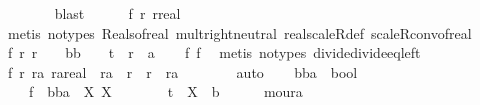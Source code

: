\begin{isabellebody}
\ \ \ \ \ \ \isamarkupfalse%
\ blast\isanewline
\ \ \ \ \isamarkupfalse%
\ f{}{\isacharcolon}\ {\isachardoublequoteopen}{\isasymforall}r{\isachardot}\ {\isacharparenleft}r{\isacharcolon}{\isacharcolon}real{\isacharparenright}\ {\isasymin}\ {\isasymreal}{\isachardoublequoteclose}\isanewline
\ \ \ \ \ \ \isamarkupfalse%
\ {\isacharparenleft}metis\ {\isacharparenleft}no{\isacharunderscore}types{\isacharparenright}\ Reals{\isacharunderscore}of{\isacharunderscore}real\ mult{\isachardot}right{\isacharunderscore}neutral\ real{\isacharunderscore}scaleR{\isacharunderscore}def\ scaleR{\isacharunderscore}conv{\isacharunderscore}of{\isacharunderscore}real{\isacharparenright}\isanewline
{}\isamarkupfalse%
\ \isamarkupfalse%
\ f{}{\isacharcolon}\ {\isachardoublequoteopen}{\isasymforall}r{\isachardot}\ {\isacharparenleft}r\ {\isacharequal}\ {}\ {\isasymor}\ bb{\isacharparenright}\ {\isasymor}\ {}\ {\isacharslash}\ t\ {\isacharslash}\ r\ {\isasymnoteq}\ a{\isachardoublequoteclose}\isanewline
\ \ \isamarkupfalse%
\ f{}\ f{}\ \isamarkupfalse%
\ {\isacharparenleft}metis\ {\isacharparenleft}no{\isacharunderscore}types{\isacharparenright}\ divide{\isacharunderscore}divide{\isacharunderscore}eq{\isacharunderscore}left{\isacharparenright}\isanewline
\ \ \isamarkupfalse%
\ f{}{\isacharcolon}\ {\isachardoublequoteopen}{\isasymforall}r\ ra{\isachardot}\ {\isacharparenleft}ra{\isacharcolon}{\isacharcolon}real{\isacharparenright}\ {\isacharslash}\ {\isacharparenleft}ra\ {\isacharslash}\ r{\isacharparenright}\ {\isacharequal}\ r\ {\isasymor}\ ra\ {\isacharequal}\ {}{\isachardoublequoteclose}\isanewline
\ \ \ \ \isamarkupfalse%
\ auto\isanewline
\ \ \isamarkupfalse%
\ bba\ {\isacharcolon}{\isacharcolon}\ bool\ \isanewline
\ \ \ \ f{}{\isacharcolon}\ {\isachardoublequoteopen}{\isacharparenleft}{\isasymnot}\ bba{\isacharparenright}\ {\isacharequal}\ {\isacharparenleft}{\isasymforall}X{}{\isachardot}\ X{}\ {\isasymnotin}\ {\isasymreal}\ {\isacharminus}\ {\isacharbraceleft}{}{\isacharbraceright}\ {\isasymor}\ {}\ {\isacharslash}\ {\isacharparenleft}t\ {\isacharasterisk}\ X{}{\isacharparenright}\ {\isasymnoteq}\ b{\isacharparenright}{\isachardoublequoteclose}\isanewline
\ \ \ \ \isamarkupfalse%
\ moura\isanewline
\ \ \isamarkupfalse%

\end{isabellebody}
